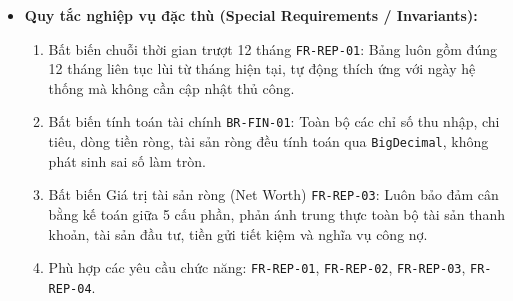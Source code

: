 \documentclass[11pt,a4paper]{article}
\providecommand{\tightlist}{
  \setlength{\itemsep}{0pt}\setlength{\parskip}{0pt}}
\begin{document}
\begin{itemize}
\begin{itemize}
    \begin{itemize}
    \tightlist
    \item
      5a1. Tại bước 5, hệ thống phát hiện \(Income_m = 0\) nhưng
      \(Expense_m > 0\) (ví dụ người dùng không có thu nhập phát sinh
      trong tháng nhưng vẫn có chi tiêu sinh hoạt).
    \item
      5a2. Nếu thực hiện phép chia cho 0 để tính \(SavingsRate\), hệ
      thống sẽ gặp lỗi \texttt{ArithmeticException}.
    \item
      5a3. Theo quy tắc xử lý biên \texttt{FR-REP-01}, hệ thống gán
      \(SavingsRate_m = 0.00\%\) (hoặc đánh dấu chỉ số âm định danh
      không áp dụng), hiển thị dòng tiền ròng âm
      (\(CashFlow = -Expense\)) và đưa ra chỉ báo thâm hụt ngân sách.
    \end{itemize}
  \item
    \emph{2a4a. Tháng trước không có chi tiêu trong danh mục khi so sánh
    biến động:}

    \begin{itemize}
    \tightlist
    \item
      2a4a1. Tại bước 2a4, hệ thống phát hiện tháng trước không có chi
      tiêu trong danh mục này (\(Amount_{\text{tháng trước}} = 0\)) nhưng
      tháng này có chi tiêu (\(Amount_{\text{tháng này}} > 0\)).
    \item
      2a4a2. Hệ thống hiển thị chênh lệch tuyệt đối
      \(\Delta Amount = Amount_{\text{tháng này}}\) và hiển thị tỷ lệ biến
      động là "Mới" (hoặc N/A), tránh thực hiện phép chia cho 0.
    \end{itemize}
  \end{itemize}
\item
  \textbf{Quy tắc nghiệp vụ đặc thù (Special Requirements /
  Invariants):}

  \begin{enumerate}
  \def\labelenumi{\arabic{enumi}.}
  \tightlist
  \item
    Bất biến chuỗi thời gian trượt 12 tháng \texttt{FR-REP-01}: Bảng
    luôn gồm đúng 12 tháng liên tục lùi từ tháng hiện tại, tự động thích
    ứng với ngày hệ thống mà không cần cập nhật thủ công.
  \item
    Bất biến tính toán tài chính \texttt{BR-FIN-01}: Toàn bộ các chỉ số
    thu nhập, chi tiêu, dòng tiền ròng, tài sản ròng đều tính toán qua
    \texttt{BigDecimal}, không phát sinh sai số làm tròn.
  \item
    Bất biến Giá trị tài sản ròng (Net Worth) \texttt{FR-REP-03}: Luôn
    bảo đảm cân bằng kế toán giữa 5 cấu phần, phản ánh trung thực toàn
    bộ tài sản thanh khoản, tài sản đầu tư, tiền gửi tiết kiệm và nghĩa
    vụ công nợ.
  \item
    Phù hợp các yêu cầu chức năng: \texttt{FR-REP-01},
    \texttt{FR-REP-02}, \texttt{FR-REP-03}, \texttt{FR-REP-04}.
  \end{enumerate}
\end{itemize}
\end{document}
